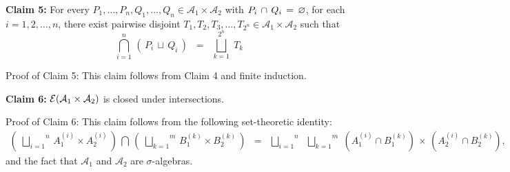 \vskip 0.5cm
\begin{center}
\begin{minipage}{6.5in}
\textbf{Claim 5:}
\vskip 0.1cm
For every $P_{1},\ldots,P_{n},Q_{1},\ldots,Q_{n} \in \mathcal{A}_{1}\times\mathcal{A}_{2}$ with
$P_{i}\,\cap\,Q_{i}\,=\,\varnothing$, for each $i = 1, 2, \ldots, n$,
there exist pairwise disjoint $T_{1}, T_{2}, T_{3}, \ldots, T_{2^{n}} \in \mathcal{A}_{1}\times\mathcal{A}_{2}$
such that
\begin{equation*}
\overset{n}{\underset{i=1}{\bigcap}} \, \left(\,P_{i}\,\sqcup\,Q_{i}\,\right)
\;\; = \;\;
	\overset{2^{n}}{\underset{k=1}{\bigsqcup}} \; T_{k}
\end{equation*}
\end{minipage}
\end{center}
Proof of Claim 5:\quad
This claim follows from Claim 4 and finite induction.

\vskip 0.5cm
\begin{center}
\begin{minipage}{6.5in}
\textbf{Claim 6:}\quad
$\mathcal{E}\!\left(\mathcal{A}_{1}\times\mathcal{A}_{2}\right)$ is closed under intersections.
\end{minipage}
\end{center}
Proof of Claim 6:\quad
This claim follows from the following set-theoretic identity:
\begin{eqnarray*}
\left(\;\overset{n}{\underset{i=1}{\bigsqcup}}\,A_{1}^{(i)} \times A_{2}^{(i)}\,\right)
\,\bigcap\,
\left(\;\overset{m}{\underset{k=1}{\bigsqcup}}\,B_{1}^{(k)} \times B_{2}^{(k)}\,\right)
& = &
	\overset{n}{\underset{i=1}{\bigsqcup}} \;\; \overset{m}{\underset{k=1}{\bigsqcup}} \;
	\left(A_{1}^{(i)} \cap B_{1}^{(k)}\right)\,\times\,\left(A_{2}^{(i)} \cap B_{2}^{(k)}\right),
\end{eqnarray*}
and the fact that $\mathcal{A}_{1}$ and $\mathcal{A}_{2}$ are $\sigma$-algebras.

